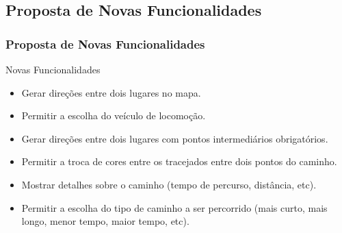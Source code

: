  \subsection{Proposta de Novas Funcionalidades}
\begin{frame}
 \frametitle{Proposta de Novas Funcionalidades}

  \begin{block}{Novas Funcionalidades}   

   \begin{itemize}

    \item  Gerar direções entre dois lugares no mapa.

    \item  Permitir a escolha do veículo de locomoção.

    \item  Gerar direções entre dois lugares com pontos intermediários obrigatórios.

    \item  Permitir a troca de cores entre os tracejados entre dois pontos do caminho.
    
    \item  Mostrar detalhes sobre o caminho (tempo de percurso, distância, etc).

    \item  Permitir a escolha do tipo de caminho a ser percorrido
    (mais curto, mais longo, menor tempo, maior tempo, etc).

   \end{itemize}

  \end{block}

\end{frame}
